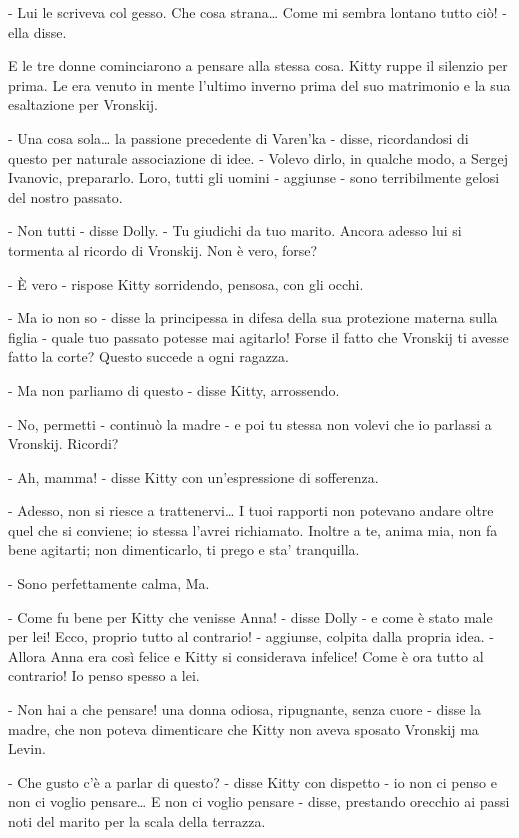 - Lui le scriveva col gesso. Che cosa strana\ldots{} Come mi sembra lontano tutto ciò! - ella disse. 

E le tre donne cominciarono a pensare alla stessa cosa. Kitty ruppe il silenzio per prima. Le era venuto in mente l'ultimo inverno prima del suo matrimonio e la sua esaltazione per Vronskij. 

- Una cosa sola\ldots{} la passione precedente di Varen'ka - disse, ricordandosi di questo per naturale associazione di idee. - Volevo dirlo, in qualche modo, a Sergej Ivanovic, prepararlo. Loro, tutti gli uomini - aggiunse - sono terribilmente gelosi del nostro passato. 

- Non tutti - disse Dolly. - Tu giudichi da tuo marito. Ancora adesso lui si tormenta al ricordo di Vronskij. Non è vero, forse? 

- È vero - rispose Kitty sorridendo, pensosa, con gli occhi. 

- Ma io non so - disse la principessa in difesa della sua protezione materna sulla figlia - quale tuo passato potesse mai agitarlo! Forse il fatto che Vronskij ti avesse fatto la corte? Questo succede a ogni ragazza. 

- Ma non parliamo di questo - disse Kitty, arrossendo. 

- No, permetti - continuò la madre - e poi tu stessa non volevi che io parlassi a Vronskij. Ricordi? 

- Ah, mamma! - disse Kitty con un'espressione di sofferenza. 

- Adesso, non si riesce a trattenervi\ldots{} I tuoi rapporti non potevano andare oltre quel che si conviene; io stessa l'avrei richiamato. Inoltre a te, anima mia, non fa bene agitarti; non dimenticarlo, ti prego e sta' tranquilla. 

- Sono perfettamente calma, Ma. 

- Come fu bene per Kitty che venisse Anna! - disse Dolly - e come è stato male per lei! Ecco, proprio tutto al contrario! - aggiunse, colpita dalla propria idea. - Allora Anna era così felice e Kitty si considerava infelice! Come è ora tutto al contrario! Io penso spesso a lei. 

- Non hai a che pensare! una donna odiosa, ripugnante, senza cuore - disse la madre, che non poteva dimenticare che Kitty non aveva sposato Vronskij ma Levin. 

- Che gusto c'è a parlar di questo? - disse Kitty con dispetto - io non ci penso e non ci voglio pensare\ldots{} E non ci voglio pensare - disse, prestando orecchio ai passi noti del marito per la scala della terrazza. 


